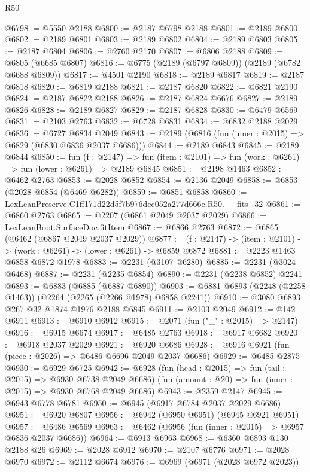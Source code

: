 \begin{lexlean}{R50}
\begin{coremodule}
@6798 := @5550 @2188
@6800 := @2187 @6798 @2188
@6801 := @2189 @6800
@6802 := @2189 @6801
@6803 := @2189 @6802
@6804 := @2189 @6803
@6805 := @2187 @6804
@6806 := @2760 @2170
@6807 := @6806 @2188
@6809 := @6805 (@6685 @6807)
@6816 := @6775 (@2189 (@6797 @6809)) (@2189 (@6782 @6688 @6809))
@6817 := @4501 @2190
@6818 := @2189 @6817
@6819 := @2187 @6818
@6820 := @6819 @2188
@6821 := @2187 @6820
@6822 := @6821 @2190
@6824 := @2187 @6822 @2188
@6826 := @2187 @6824 @6676
@6827 := @2189 @6826
@6828 := @2189 @6827
@6829 := @2187 @6828
@6830 := @6479 @6569
@6831 := @2103 @2763
@6832 := @6728 @6831
@6834 := @6832 @2188 @2029
@6836 := @6727 @6834 @2049
@6843 := @2189 (@6816 (fun (inner : @2015) => @6829 (@6830 @6836 @2037 @6686)))
@6844 := @2189 @6843
@6845 := @2189 @6844
@6850 := fun (f : @2147) =>
  fun (item : @2101) => fun (work : @6261) => fun (lower : @6261) => @2189 @6845
@6851 := @2198 @1463
@6852 := @6462 @2763
@6853 := @2028 @6852
@6854 := @2136 @2049
@6858 := @6853 (@2028 @6854 (@6469 @6282))
@6859 := @6851 @6858
@6860 := LexLeanPreserve.C1ff171d22d5f7b976dcc052a277d666e.R50.__fits_32
@6861 := @6860 @2763
@6865 := @2207 (@6861 @2049 @2037 @2029)
@6866 := LexLeanBoot.SurfaceDoc.fitItem
@6867 := @6866 @2763
@6872 := @6865 (@6462 (@6867 @2049 @2037 @2029))
@6877 := (f : @2147) -> (item : @2101) -> (work : @6261) -> (lower : @6261) -> @6859 @6872
@6881 := @2223 @1463 @6858 @6872 @1978
@6883 := @2231 (@3107 @6280)
@6885 := @2231 (@3024 @6468)
@6887 := @2231 (@2235 @6854)
@6890 := @2231 (@2238 @6852) @2241
@6893 := @6883 (@6885 (@6887 @6890))
@6903 := @6881 @6893 (@2248 (@2258 @1463)) (@2264 (@2265 (@2266 @1978) @6858 @2241))
@6910 := @3080 @6893 @267 @32 @1874 @1976 @2188 @6845
@6911 := @2103 @2049
@6912 := @142 @6911
@6913 := @6910 @6912
@6915 := @2071 (fun ("_" : @2015) => @2147)
@6916 := @6915 @6674
@6917 := @6485 @2763
@6918 := @6917 @6682
@6920 := @6918 @2037 @2029
@6921 := @6920 @6686
@6928 := @6916 @6921 (fun (piece : @2026) => @6486 @6696 @2049 @2037 @6686)
@6929 := @6485 @2875
@6930 := @6929 @6725
@6942 := @6928
    (fun (head : @2015) => fun (tail : @2015) => @6930 @6738 @2049 @6686)
    (fun (amount : @20) => fun (inner : @2015) => @6930 @6768 @2049 @6686)
@6943 := @2359 @2147
@6945 := @6943 @6778 @6781
@6950 := @6945 (@6917 @6784 @2037 @2029 @6686)
@6951 := @6920 @6807
@6956 := @6942 (@6950 @6951) (@6945 @6921 @6951)
@6957 := @6486 @6569
@6963 := @6462 (@6956 (fun (inner : @2015) => @6957 @6836 @2037 @6686))
@6964 := @6913 @6963
@6968 := @6360 @6893 @130 @2188 @26
@6969 := @2028 @6912
@6970 := @2107 @6776
@6971 := @2028 @6970
@6972 := @2112 @6674
@6976 := @6969 (@6971 (@2028 @6972 @2023))

\end{coremodule}
\end{lexlean}
